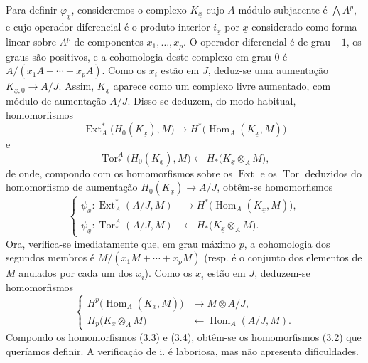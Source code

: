 Para definir $\varphi_{\underline{x}}$, consideremos o complexo
$K_{\underline{x}}$ cujo $A$-módulo subjacente é $\bigwedge A^{p}$, e
cujo operador diferencial é o produto interior $i_{\underline{x}}$ por
$\underline{x}$ considerado como forma linear sobre $A^{p}$ de componentes
$x_1,\ldots,x_p$. O operador diferencial é de grau $-1$, os graus são
positivos, e a cohomologia deste complexo em grau $0$ é
$A/(x_1A+\cdots+x_pA)$. Como os $x_i$ estão em $J$, deduz-se uma
aumentação $K_{\underline{x},0}\longrightarrow A/J$. Assim,
$K_{\underline{x}}$ aparece como um complexo livre aumentado, com módulo
de aumentação $A/J$. Disso se deduzem, do modo habitual, homomorfismos
\[
\operatorname{Ext}_{A}^{*}\bigl(H_0(K_{\underline{x}}),M\bigr)
\longrightarrow
H^{*}\bigl(\operatorname{Hom}_{A}(K_{\underline{x}},M)\bigr)
\]
e
\[
\operatorname{Tor}_{*}^{A}\bigl(H_0(K_{\underline{x}}),M\bigr)
\longleftarrow
H_{*}\bigl(K_{\underline{x}}\otimes_A M\bigr),
\]
de onde, compondo com os homomorfismos sobre os $\operatorname{Ext}$ e os
$\operatorname{Tor}$ deduzidos do homomorfismo de aumentação
$H_0(K_{\underline{x}})\longrightarrow A/J$, obtêm-se homomorfismos
\begin{equation}\tag{3.3}
\left\{
\begin{aligned}
\psi_{\underline{x}}:
\operatorname{Ext}_{A}^{*}(A/J,M)
&\longrightarrow H^{*}\bigl(\operatorname{Hom}_{A}(K_{\underline{x}},M)\bigr),\\
\psi_{\underline{x}}:
\operatorname{Tor}_{*}^{A}(A/J,M)
&\longleftarrow H_{*}\bigl(K_{\underline{x}}\otimes_A M\bigr).
\end{aligned}
\right.
\end{equation}
Ora, verifica-se imediatamente que, em grau máximo $p$, a cohomologia dos segundos
membros é $M/(x_1M+\cdots+x_pM)$ (resp. é o conjunto dos elementos de $M$
anulados por cada um dos $x_i$). Como os $x_i$ estão em $J$, deduzem-se
homomorfismos
\begin{equation}\tag{3.4}
\left\{
\begin{aligned}
H^{p}\bigl(\operatorname{Hom}_{A}(K_{\underline{x}},M)\bigr)
&\longrightarrow M\otimes A/J,\\
H_{p}\bigl(K_{\underline{x}}\otimes_A M\bigr)
&\longleftarrow\operatorname{Hom}_{A}(A/J,M).
\end{aligned}
\right.
\end{equation}
Compondo os homomorfismos (3.3) e (3.4), obtêm-se os homomorfismos (3.2)
que queríamos definir. A verificação de i. é laboriosa, mas não
apresenta dificuldades.

